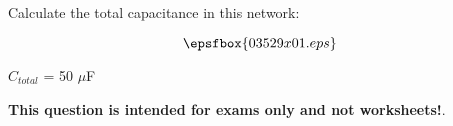 

Calculate the total capacitance in this network:

$$\epsfbox{03529x01.eps}$$







$C_{total}$ = 50 $\mu$F







{\bf This question is intended for exams only and not worksheets!}.



